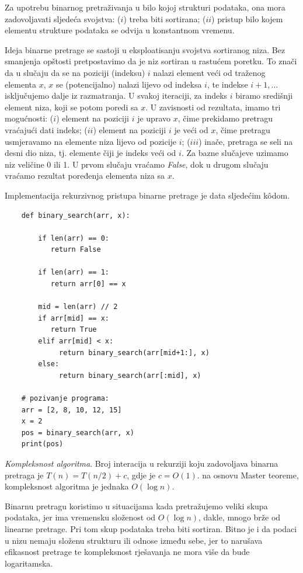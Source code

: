 Za upotrebu binarnog pretraživanja u bilo kojoj strukturi podataka, ona mora zadovoljavati sljedeća svojstva: ($i$) treba biti sortirana; 
($ii$) pristup bilo kojem elementu strukture podataka se odvija u konsta\-ntnom vremenu.

Ideja binarne pretrage se sastoji u eksploatisanju svojstva sortiranog niza.  Bez smanjenja opštosti pretpostavimo da je niz sortiran u rastućem poretku. To znači da u slučaju da se na poziciji (indeksu) $i$ nalazi element veći od traženog elementa $x$, $x$ se (potencijalno) nalazi lijevo od indeksa $i$, te indekse $i+1, \ldots$ isključujemo dalje iz razmatranja. U svakoj iteraciji, za indeks $i$ biramo središnji element niza, koji se potom poredi sa $x$. U zavisnosti od rezultata, imamo tri mogućnosti: ($i$) element na poziciji $i$ je upravo $x$, čime prekidamo pretragu vraćajući dati indeks; ($ii$)  element na poziciji $i$ je veći od $x$, čime pretragu usmjeravamo na elemente niza lijevo od pozicije $i$; ($iii$) inače, pretraga se seli na desni dio niza, tj. elemente čiji je indeks veći od $i$. Za bazne slučajeve uzimamo  niz veličine 0 ili 1. U prvom slučaju vraćamo \textit{False}, dok u drugom slučaju vraćamo rezultat poređenja elementa niza sa $x$.  

Implementacija rekurzivnog pristupa binarne pretrage je data sljede\-ćim k\^odom.

\begin{verbatim}
	def binary_search(arr, x):
	   
	    if len(arr) == 0:
	       return False
	        
	    if len(arr) == 1:
	       return arr[0] == x  
	       
	    mid = len(arr) // 2
	    if arr[mid] == x:
	       return True
	    elif arr[mid] < x:
	         return binary_search(arr[mid+1:], x)
	    else: 
	         return binary_search(arr[:mid], x)

    # pozivanje programa:
    arr = [2, 8, 10, 12, 15]
    x = 2
    pos = binary_search(arr, x)
    print(pos)
\end{verbatim} 

\textit{Kompleksnost algoritma}. Broj interacija u rekurziji koju zadovoljava binarna pretraga je $T(n) = T(n/2) + c$, gdje je $c=O(1)$. na osnovu Master teoreme, kompleksnost algoritma je jednaka $O(\log n)$. 

Binarnu pretragu koristimo u situacijama kada pretražujemo veliki skupa  podataka, jer ima vremensku složenost od $O(\log n)$, dakle, mnogo brže od linearne pretrage. Pri tom  skup podataka treba biti sortiran.
Bitno je i da podaci u nizu nemaju složenu strukturu ili odnose između sebe, jer to narušava efikasnost pretrage te kompleksnost rješavanja ne mora više da bude logaritamska.  

